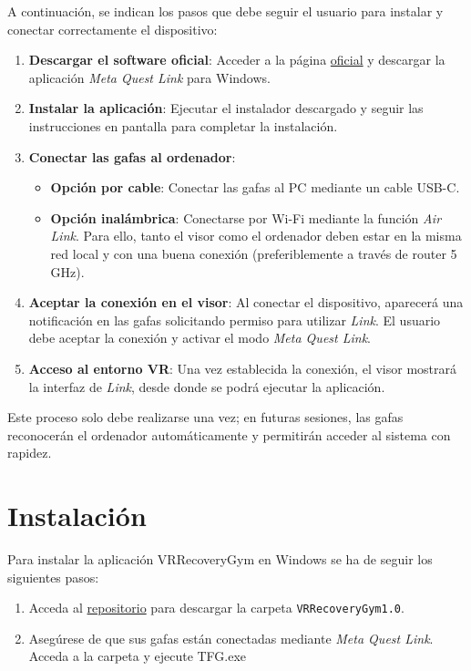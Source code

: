 A continuación, se indican los pasos que debe seguir el usuario para instalar y conectar correctamente el dispositivo:

\begin{enumerate}
    \item \textbf{Descargar el software oficial}: Acceder a la página \href{https://www.meta.com/quest/setup/}{oficial} y descargar la aplicación \textit{Meta Quest Link} para Windows.

    \item \textbf{Instalar la aplicación}: Ejecutar el instalador descargado y seguir las instrucciones en pantalla para completar la instalación.

    \item \textbf{Conectar las gafas al ordenador}:
    \begin{itemize}
        \item \textbf{Opción por cable}: Conectar las gafas al PC mediante un cable USB-C.
        \item \textbf{Opción inalámbrica}: Conectarse por Wi-Fi mediante la función \textit{Air Link}. Para ello, tanto el visor como el ordenador deben estar en la misma red local y con una buena conexión (preferiblemente a través de router 5 GHz).
    \end{itemize}

    \item \textbf{Aceptar la conexión en el visor}: Al conectar el dispositivo, aparecerá una notificación en las gafas solicitando permiso para utilizar \textit{Link}. El usuario debe aceptar la conexión y activar el modo \textit{Meta Quest Link}.

    \item \textbf{Acceso al entorno VR}: Una vez establecida la conexión, el visor mostrará la interfaz de \textit{Link}, desde donde se podrá ejecutar la aplicación.
\end{enumerate}

Este proceso solo debe realizarse una vez; en futuras sesiones, las gafas reconocerán el ordenador automáticamente y permitirán acceder al sistema con rapidez.

\section{Instalación}
Para instalar la aplicación VRRecoveryGym en Windows se ha de seguir los siguientes pasos:
\begin{enumerate}
    \item Acceda al \href{https://gitlab.com/HP-SCDS/Observatorio/2024-2025/vrrecoverygym/ubu-vrrecoverygym}{repositorio} para descargar la carpeta \texttt{VRRecoveryGym1.0}.
    
    \item Asegúrese de que sus gafas están conectadas mediante \textit{Meta Quest Link}. Acceda a la carpeta y ejecute TFG.exe 
\end{enumerate}

